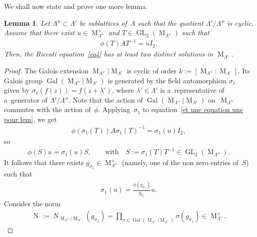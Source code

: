 \documentclass[10pt,a4paper]{amsart}
\numberwithin{equation}{section}
\newtheorem{Lemma}[Theorem]{Lemma}
\begin{document}
We shall now state and prove one more lemma.

\begin{Lemma}
\label{lem descente}
Let $\Lambda'' \subset \Lambda'$ be sublattices of~$\Lambda$ such that the quotient $\Lambda'/\Lambda''$ is cyclic.
Assume that there exist $u \in \operatorname{M}_{\Lambda''}^{\times}$ and $T \in
\operatorname{GL}_{2}(\operatorname{M}_{\Lambda''})$ such that
\begin{gather}
\label{et une equation une pour lem}
\phi(T)AT^{-1}=u I_{2}.
\end{gather}
Then, the Riccati equation~\eqref{eq4} has at least two distinct solutions in $\operatorname{M}_{\Lambda'}$.
\end{Lemma}

\begin{proof}
The Galois extension $ \operatorname{M}_{\Lambda''} \vert \operatorname{M}_{\Lambda'} $ is cyclic of order
$k:=[\operatorname{M}_{\Lambda''}: \operatorname{M}_{\Lambda'}]$.
Its Galois group $\operatorname{Gal}(\operatorname{M}_{\Lambda''}|\operatorname{M}_{\Lambda'})$ is generated by the
f\/ield automorphism $\sigma_{1}$ given by $\sigma_{1}(f(z))=f(z+\lambda')$, where $\lambda' \in \Lambda'$ is
a~representative of a~generator of $\Lambda'/\Lambda''$.
Note that the action of $\operatorname{Gal}(\operatorname{M}_{\Lambda''}|\operatorname{M}_{\Lambda'})$ on~$\operatorname{M}_{\Lambda''}$ commutes with the action of~$\phi$.
Applying~$\sigma_{1}$ to equation~\eqref{et une equation une pour lem}, we get
\begin{gather*}
\phi(\sigma_{1} (T))A\sigma_{1}(T)^{-1}=\sigma_{1}(u) I_{2},
\end{gather*}
so
\begin{gather*}
\phi(S)u=\sigma_{1}(u) S, \qquad \text{with} \quad S:=\sigma_{1}(T) T^{-1} \in \operatorname{GL}_{2}(\operatorname{M}_{\Lambda''}).
\end{gather*}
It follows that there exists $g_{\sigma_{1}}\in \operatorname{M}_{\Lambda''}^{\times}$ (namely, one of the non zero
entries of~$S$) such that
\begin{gather*}
\sigma_{1}(u)=\frac{\phi (g_{\sigma_{1}})}{g_{\sigma_{1}}}u.
\end{gather*}
Consider the norm
\begin{gather*}
\operatorname{N}:=\operatorname{N}_{\operatorname{M}_{\Lambda''}|\operatorname{M}_{\Lambda'}}(g_{\sigma_1})=
\prod\limits_{\sigma \in \operatorname{Gal}(\operatorname{M}_{\Lambda''}|\operatorname{M}_{\Lambda'})} \sigma
(g_{\sigma_1}) \in \operatorname{M}_{\Lambda'}^{\times}.

\end{gather*}
\end{proof}
\end{document}
